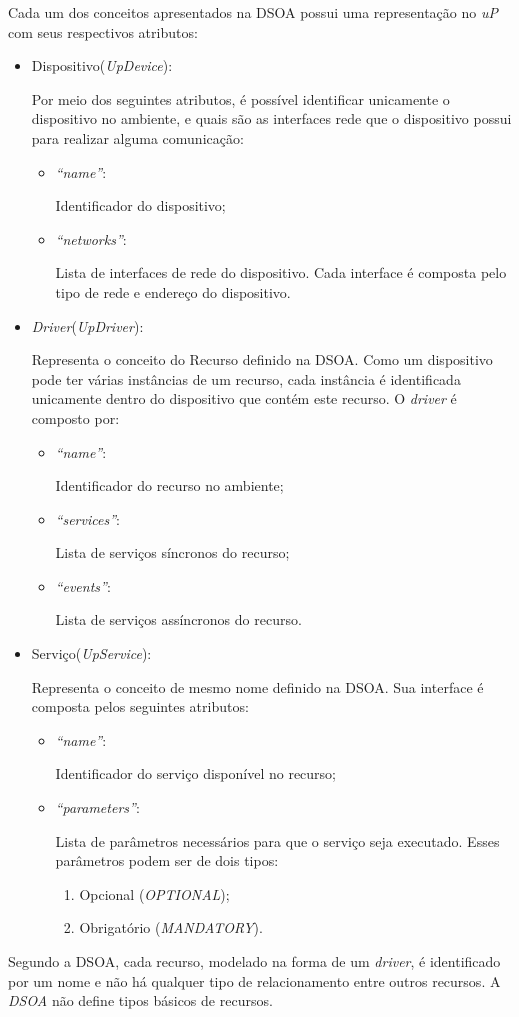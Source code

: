 Cada um dos conceitos apresentados na DSOA possui uma representação no \emph{uP} com seus respectivos atributos:

\begin{itemize}
	\item Dispositivo(\emph{UpDevice}):
	
		Por meio dos seguintes atributos, é possível identificar unicamente o dispositivo no ambiente, e quais são as interfaces rede que o dispositivo possui para realizar alguma comunicação:
		\begin{itemize}
			\item \emph{``name''}: 
			
			Identificador do dispositivo;
			\item \emph{``networks''}: 

			Lista de interfaces de rede do dispositivo. Cada interface é composta pelo tipo de rede e endereço do dispositivo.
		\end{itemize}
	\item \emph{Driver}(\emph{UpDriver}): 

		Representa o conceito do Recurso definido na DSOA. Como um dispositivo pode ter várias instâncias de um recurso, cada instância é identificada unicamente dentro do dispositivo que contém este recurso. O \emph{driver} é composto por:
		\begin{itemize}
			\item \emph{``name''}:

				Identificador do recurso no ambiente;
			\item \emph{``services''}:
				
				Lista de serviços síncronos do recurso;
			\item \emph{``events''}:
				
				Lista de serviços assíncronos do recurso.
		\end{itemize}
	\item Serviço(\emph{UpService}): 

		Representa o conceito de mesmo nome definido na DSOA. Sua interface é composta pelos seguintes atributos:
		\begin{itemize}
			\item \emph{``name''}:

				Identificador do serviço disponível no recurso;
			\item \emph{``parameters''}:
				
				Lista de parâmetros necessários para que o serviço seja executado. Esses parâmetros podem ser de dois tipos:
				\begin{enumerate}
					\item Opcional (\emph{OPTIONAL});
					\item Obrigatório (\emph{MANDATORY}).
				\end{enumerate}
		\end{itemize}
\end{itemize}

Segundo a DSOA, cada recurso, modelado na forma de um \emph{driver}, é identificado por um nome e não há qualquer tipo de relacionamento entre outros recursos. A \emph{DSOA} não define tipos básicos de recursos.	
